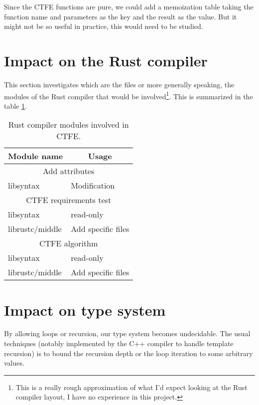 \documentclass[a4paper,11pt]{article}
\begin{document}
Since the CTFE functions are pure, we could add a memoization table taking the function name and parameters as the key and the result as the value. But it might not be so useful in practice, this would need to be studied.

\section{Impact on the Rust compiler}
\label{impact-rust-compiler}

This section investigates which are the files or more generally speaking, the modules of the Rust compiler that would be involved\footnote{This is a really rough approximation of what I'd expect looking at the Rust compiler layout, I have no experience in this project.}. This is summarized in the table \ref{rust-changes}.
\newline

\begin{table}[h!]
\begin{tabular}{| l | l |} \hline 
\multicolumn{1}{|c|}{\textbf{Module name}} & \multicolumn{1}{|c|}{\textbf{Usage}} \\ \hline
\multicolumn{2}{|c|}{Add attributes} \\ \hline
libsyntax & Modification \\ \hline
\multicolumn{2}{|c|}{CTFE requirements test} \\ \hline
libsyntax & read-only \\ \hline
librustc/middle & Add specific files \\ \hline
\multicolumn{2}{|c|}{CTFE algorithm} \\ \hline
libsyntax & read-only \\ \hline
librustc/middle & Add specific files \\ \hline
\end{tabular}
\centering
\caption{Rust compiler modules involved in CTFE.}
\label{rust-changes}
\end{table}

\section{Impact on type system}
\label{impact-type}

By allowing loops or recursion, our type system becomes undecidable. The usual techniques (notably implemented by the C++ compiler to handle template recursion) is to bound the recursion depth or the loop iteration to some arbitrary values.
\end{document}
